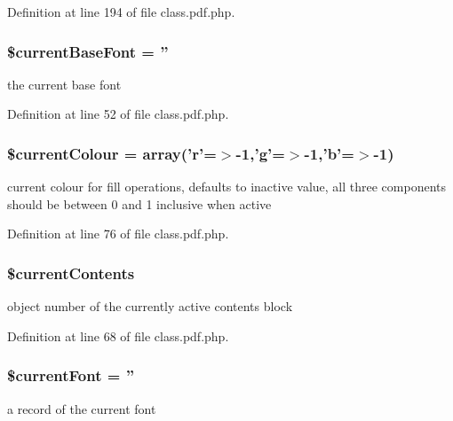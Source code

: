 \-Definition at line 194 of file class.\-pdf.\-php.

\hypertarget{class_cpdf_afe5d6644791e89099b37ce806592903a}{
\subsubsection[{\$current\-Base\-Font}]{\setlength{\rightskip}{0pt plus 5cm}\$current\-Base\-Font = ''}}\label{class_cpdf_afe5d6644791e89099b37ce806592903a}
the current base font 

\-Definition at line 52 of file class.\-pdf.\-php.

\hypertarget{class_cpdf_a9c9591fc5b60e6bc98bc8898232d4844}{
\subsubsection[{\$current\-Colour}]{\setlength{\rightskip}{0pt plus 5cm}\$current\-Colour = array('r'=$>$-\/1,'g'=$>$-\/1,'b'=$>$-\/1)}}\label{class_cpdf_a9c9591fc5b60e6bc98bc8898232d4844}
current colour for fill operations, defaults to inactive value, all three components should be between 0 and 1 inclusive when active 

\-Definition at line 76 of file class.\-pdf.\-php.

\hypertarget{class_cpdf_a39303dffdd053136f221e31bb18ccd6b}{
\subsubsection[{\$current\-Contents}]{\setlength{\rightskip}{0pt plus 5cm}\$current\-Contents}}\label{class_cpdf_a39303dffdd053136f221e31bb18ccd6b}
object number of the currently active contents block 

\-Definition at line 68 of file class.\-pdf.\-php.

\hypertarget{class_cpdf_a2d5823c32698fc3761bb1254a0282b5e}{
\subsubsection[{\$current\-Font}]{\setlength{\rightskip}{0pt plus 5cm}\$current\-Font = ''}}\label{class_cpdf_a2d5823c32698fc3761bb1254a0282b5e}
a record of the current font 

